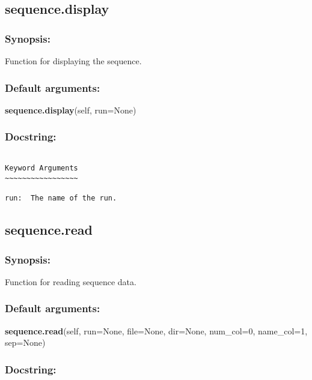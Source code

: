 \newpage

\subsection{sequence.display}


\subsubsection{Synopsis:}

Function for displaying the sequence.

\subsubsection{Default arguments:}

\textsf{\textbf{sequence.display}(self, run=None)
}


\subsubsection{Docstring:}

{\scriptsize
\begin{verbatim}

Keyword Arguments
~~~~~~~~~~~~~~~~~

run:  The name of the run.
\end{verbatim}
}



\newpage

\subsection{sequence.read}


\subsubsection{Synopsis:}

Function for reading sequence data.

\subsubsection{Default arguments:}

\textsf{\textbf{sequence.read}(self, run=None, file=None, dir=None, num\_col=0, name\_col=1, sep=None)
}


\subsubsection{Docstring:}

